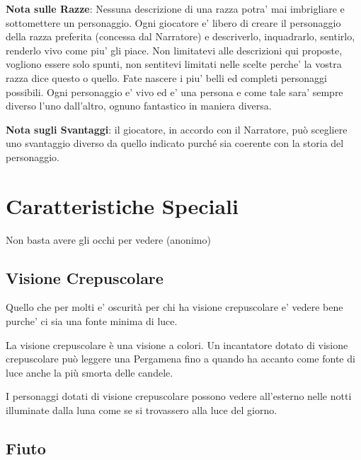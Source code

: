 \documentclass[a4paper,11pt,twoside,openany]{book}
\begin{document}
\bigskip

\textbf{Nota sulle Razze}: Nessuna descrizione di una razza potra' mai imbrigliare e sottomettere un personaggio. Ogni giocatore e' libero di creare il personaggio della razza preferita (concessa dal Narratore) e descriverlo, inquadrarlo, sentirlo, renderlo vivo come piu' gli piace.
Non limitatevi alle descrizioni qui proposte, vogliono essere solo spunti, non sentitevi limitati nelle scelte perche' la vostra razza dice questo o quello.
Fate nascere i piu' belli ed completi personaggi possibili.
Ogni personaggio e' vivo ed e' una persona e come tale sara' sempre diverso l'uno dall'altro, ognuno fantastico in maniera diversa.

\textbf{Nota sugli Svantaggi}: il giocatore, in accordo con il Narratore, può scegliere uno svantaggio diverso da quello indicato purché sia coerente con la storia del personaggio.

\pagebreak

\section{Caratteristiche Speciali}

\label{caratteristiche-speciali}

\begin{tcolorbox}[enhanced,arc=5pt,boxrule=0.3pt]{Non basta avere gli occhi per vedere (anonimo)}\end{tcolorbox}\medskip


\subsection{Visione Crepuscolare}

Quello che per molti e’ oscurità per chi ha visione crepuscolare e’ vedere bene purche’ ci sia una fonte minima di luce.

La visione crepuscolare è una visione a colori.
Un incantatore dotato di visione crepuscolare può leggere una Pergamena fino a quando ha accanto come fonte di luce anche la più smorta delle candele.

I personaggi dotati di visione crepuscolare possono vedere all’esterno nelle notti illuminate dalla luna come se si trovassero alla luce del giorno.

\subsection{Fiuto}
\end{document}
